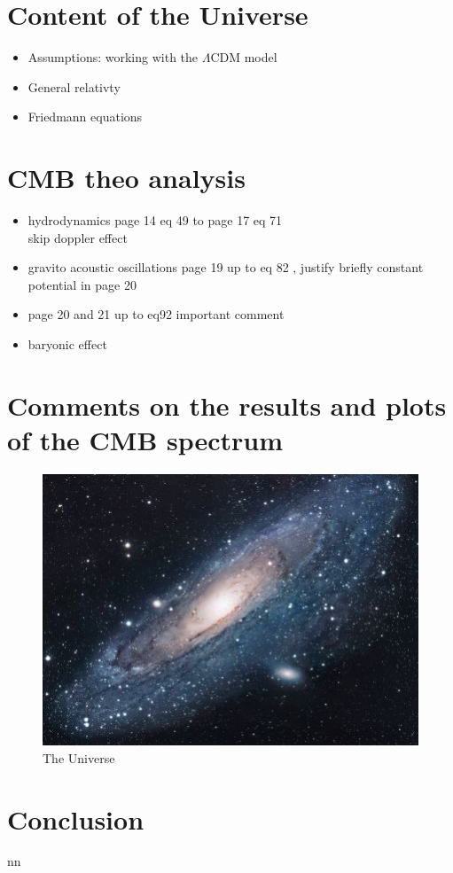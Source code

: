 \documentclass{article}
\begin{document}
\section{Content of the Universe}
\begin{itemize}
\item Assumptions: working with the $\Lambda$CDM model
\item General relativty
\item Friedmann equations
\end{itemize}

\section{CMB theo analysis}
\begin{itemize}
\item hydrodynamics \citep{huLectureNotesCMB2008}
page 14 eq 49 to page 17 eq 71\\
skip doppler effect
\item gravito acoustic oscillations page 19 up to eq 82 , justify briefly constant potential in page 20
\item page 20 and 21 up to eq92 important comment 
\item baryonic effect
\end{itemize}

\section{Comments on the results and plots of the CMB spectrum}






\begin{figure}[h!]
\centering
\includegraphics[scale=1.7]{universe}
\caption{The Universe}
\label{fig:universe}
\end{figure}

\section{Conclusion}
nn
\citep{padmanabhanDetectingDarkMatter2005}





\end{document}
